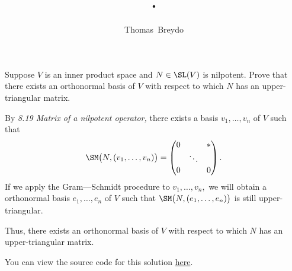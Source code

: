 \documentclass{amsart}
\title{\pagenum.\probnum}
\author{Thomas\ Breydo}
\newcommand{\pagenum}{250}
\newcommand{\probnum}{14}
\begin{document}
\maketitle

\begin{problem*}
Suppose $V$ is an inner product space and $N\in\SL(V)$ is nilpotent.
Prove that there exists an orthonormal basis of $V$ with respect
to which $N$ has an upper-triangular matrix.
\end{problem*}

\vspace{0.5in}

By \textit{8.19 Matrix of a nilpotent operator,} there exists
a basis $v_1,\ldots,v_n$ of $V$ such that
\begin{align*}
    \SM\big(N,(v_1,\dots,v_n)\big) = \begin{pmatrix}
        0 & & * \\
          & \ddots & \\
        0 & & 0
    \end{pmatrix}.
\end{align*}
If we apply the Gram---Schmidt procedure to $v_1,\ldots,v_n,$
we will obtain a orthonormal basis $e_1,\ldots,e_n$ of $V$
such that $\SM\big(N,(e_1,\ldots,e_n)\big)$ is still
upper-triangular.

Thus, there exists an orthonormal basis of $V$ with respect to
which $N$ has an upper-triangular matrix.

\vspace{0.5in}

\begin{note*}
You can view the source code for this solution
\href{https://github.com/thomasbreydo/linalg/blob/main/\pagenum_\probnum_Thomas_Breydo.tex}
{here}.
\end{note*}
\end{document}
